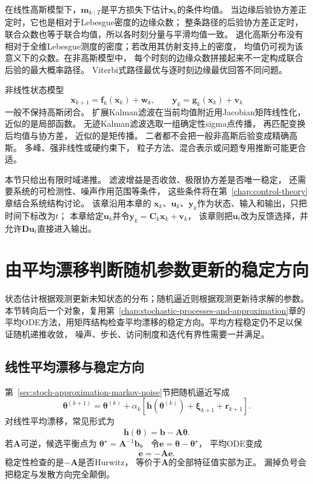 在线性高斯模型下，$\bm{m}_{k\mid T}$是平方损失下估计$\bm{x}_{k}$的条件均值。
当边缘后验协方差正定时，它也是相对于Lebesgue密度的边缘众数；
整条路径的后验协方差正定时，联合众数也等于联合均值，所以各时刻分量与平滑均值一致。
退化高斯分布没有相对于全维Lebesgue测度的密度；若改用其仿射支持上的密度，
均值仍可视为该意义下的众数。在非高斯模型中，
每个时刻的边缘众数拼接起来不一定构成联合后验的最大概率路径。
Viterbi式路径最优与逐时刻边缘最优回答不同问题。

非线性状态模型
\[
	\bm{x}_{k+1}=\bm{f}_{k}(\bm{x}_{k})+\bm{w}_{k}, \qquad \bm{y}_{k}=\bm{g}_{k}(\bm
	{x}_{k})+\bm{v}_{k}
\]
一般不保持高斯闭合。 扩展Kalman滤波在当前均值附近用Jacobian矩阵线性化， 近似的是局部函数。
无迹Kalman滤波选取一组确定性sigma点传播， 再匹配变换后均值与协方差， 近似的是矩传播。
二者都不会把一般非高斯后验变成精确高斯。 多峰、强非线性或硬约束下， 粒子方法、混合表示或问题专用推断可能更合适。

本节只给出有限时域递推。 滤波增益是否收敛、极限协方差是否唯一稳定，
还需要系统的可检测性、噪声作用范围等条件，
这些条件将在第~\ref{chap:control-theory}章结合系统结构讨论。 该章沿用本章的
$\bm{x}_{k}$、$\bm{u}_{k}$、$\bm{y}_{k}$作为状态、输入和输出，只把时间下标改为$t$；
本章给定$\bm{u}_{k}$并令$\bm{y}_{k}=\bm{C}_{k}\bm{x}_{k}+\bm{v}_{k}$，
该章则把$\bm{u}_{t}$改为反馈选择，并允许$\bm{D}\bm{u}_{t}$直接进入输出。

\section{由平均漂移判断随机参数更新的稳定方向}
\label{sec:dynamical-mean-dynamics-linear-recursion}

状态估计根据观测更新未知状态的分布；随机逼近则根据观测更新待求解的参数。
本节转向后一个对象，复用第~\ref{chap:stochastic-processes-and-approximation}章的
平均ODE方法，用矩阵结构检查平均漂移的稳定方向。平均方程稳定仍不足以保证随机递推收敛，
噪声、步长、访问制度和迭代有界性需要一并满足。

\subsection{线性平均漂移与稳定方向}

第~\ref{sec:stoch-approximation-markov-noise}节把随机逼近写成
\[
	\bm{\theta}^{(k+1)}= \bm{\theta}^{(k)}+ \alpha_{k}[ \overline{\bm{h}}(\bm{\theta}
	^{(k)}) +\bm{\xi}_{k+1}+\bm{r}_{k+1}].
\]
对线性平均漂移，常见形式为
\begin{equation}
	\overline{\bm{h}}(\bm{\theta}) = \bm{b}-\bm{A}\bm{\theta}. \label{eq:dynamical-linear-mean-drift}
\end{equation}
若$\bm{A}$可逆，候选平衡点为 $\bm{\theta}^{\star}=\bm{A}^{-1}\bm{b}$。 令$\bm{e}=
\bm{\theta}-\bm{\theta}^{\star}$， 平均ODE变成
\begin{equation}
	\dot{\bm{e}}=-\bm{A}\bm{e}. \label{eq:dynamical-linear-mean-error-ode}
\end{equation}
稳定性检查的是$-\bm{A}$是否Hurwitz， 等价于$\bm{A}$的全部特征值实部为正。 漏掉负号会把稳定与发散方向完全颠倒。

